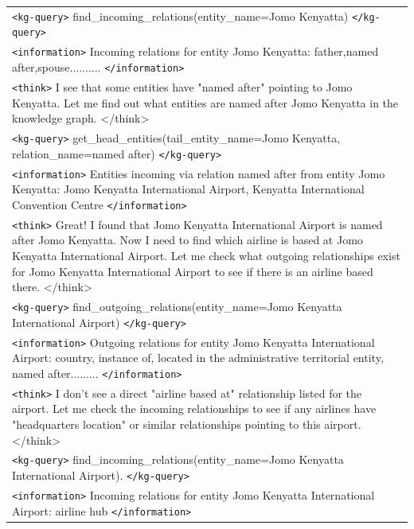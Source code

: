 \begin{table}[ht]
\begin{tabular}{>{\raggedright\arraybackslash}p{}}
\rowcolor{green!10}
\texttt{<kg-query>} find\_incoming\_relations(entity\_name=Jomo Kenyatta) \texttt{</kg-query>} \\
\rowcolor{yellow!10}
\texttt{<information>} Incoming relations for entity Jomo Kenyatta: father,named after,spouse.......... \texttt{</information>} \\

\rowcolor{blue!10}
\texttt{<think>} I see that some entities have "named after" pointing to Jomo Kenyatta. Let me find out what entities are named after Jomo Kenyatta in the knowledge graph. {</think>} \\

\rowcolor{green!10}
\texttt{<kg-query>} get\_head\_entities(tail\_entity\_name=Jomo Kenyatta, relation\_name=named after)  \texttt{</kg-query>} \\
\rowcolor{yellow!10}
\texttt{<information>} Entities incoming via relation named after from entity Jomo Kenyatta: Jomo Kenyatta International Airport, Kenyatta International Convention Centre \texttt{</information>} \\

\rowcolor{blue!10}
\texttt{<think>}  Great! I found that Jomo Kenyatta International Airport is named after Jomo Kenyatta. Now I need to find which airline is based at Jomo Kenyatta International Airport. Let me check what outgoing relationships exist for Jomo Kenyatta International Airport to see if there is an airline based there. {</think>} \\

\rowcolor{green!10}
\texttt{<kg-query>} find\_outgoing\_relations(entity\_name=Jomo Kenyatta International Airport)  \texttt{</kg-query>} \\
\rowcolor{yellow!10}
\texttt{<information>} Outgoing relations for entity Jomo Kenyatta International Airport: country, instance of, located in the administrative territorial entity, named after......... \texttt{</information>} \\

\rowcolor{blue!10}
\texttt{<think>} I don't see a direct "airline based at" relationship listed for the airport. Let me check the incoming relationships to see if any airlines have "headquarters location" or similar relationships pointing to this airport. {</think>} \\

\rowcolor{green!10}
\texttt{<kg-query>} find\_incoming\_relations(entity\_name=Jomo Kenyatta International Airport).  \texttt{</kg-query>} \\
\rowcolor{yellow!10}
\texttt{<information>} Incoming relations for entity Jomo Kenyatta International Airport: airline hub \texttt{</information>} \\


\end{tabular}
\end{table}
